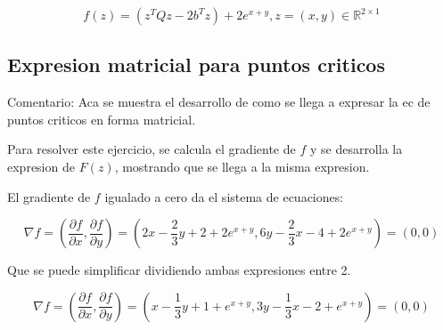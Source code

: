 \documentclass{article}
\begin{document}
    \begin{equation}
        f(z) = (z^{T}Qz - 2b^{T}z) + 2e^{x+y}, z = (x,y) \in \mathbb{R}^{2\times1}
    \end{equation}

    \subsection{Expresion matricial para puntos criticos}
    Comentario: Aca se muestra el desarrollo de como se llega a expresar la ec de puntos criticos en forma matricial.
    
    Para resolver este ejercicio, se calcula el gradiente de $f$ y se desarrolla la expresion de $F(z)$, mostrando que se
    llega a la misma expresion.

    El gradiente de $f$ igualado a cero da el sistema de ecuaciones:
    
    \begin{equation}
        \nabla f = \left( \frac{\partial f}{\partial x}, \frac{\partial f}{\partial y} \right)
        =
        \left( 2x - \frac{2}{3}y + 2 + 2e^{x+y}, 6y - \frac{2}{3}x - 4 + 2e^{x+y} \right) = (0,0)
    \end{equation}

    Que se puede simplificar dividiendo ambas expresiones entre 2.
    
    \begin{equation}
        \nabla f = \left( \frac{\partial f}{\partial x}, \frac{\partial f}{\partial y} \right)
        =
        \left( x - \frac{1}{3}y + 1 + e^{x+y}, 3y - \frac{1}{3}x - 2 + e^{x+y} \right) = (0,0)
    \end{equation}
\end{document}
